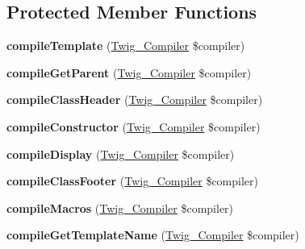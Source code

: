 \subsection*{Protected Member Functions}
\begin{DoxyCompactItemize}
\item 
\hypertarget{class_twig___node___module_a90bc59296bb0c90f305703bfd1d37566}{}{\bfseries compile\+Template} (\hyperlink{class_twig___compiler}{Twig\+\_\+\+Compiler} \$compiler)\label{class_twig___node___module_a90bc59296bb0c90f305703bfd1d37566}

\item 
\hypertarget{class_twig___node___module_ab4896098ce341e82963cb3faddd833dd}{}{\bfseries compile\+Get\+Parent} (\hyperlink{class_twig___compiler}{Twig\+\_\+\+Compiler} \$compiler)\label{class_twig___node___module_ab4896098ce341e82963cb3faddd833dd}

\item 
\hypertarget{class_twig___node___module_a0291e47aca499d273c3e735ef595c927}{}{\bfseries compile\+Class\+Header} (\hyperlink{class_twig___compiler}{Twig\+\_\+\+Compiler} \$compiler)\label{class_twig___node___module_a0291e47aca499d273c3e735ef595c927}

\item 
\hypertarget{class_twig___node___module_a2991abb5506b65360852de0145516048}{}{\bfseries compile\+Constructor} (\hyperlink{class_twig___compiler}{Twig\+\_\+\+Compiler} \$compiler)\label{class_twig___node___module_a2991abb5506b65360852de0145516048}

\item 
\hypertarget{class_twig___node___module_a448d9fcedb5f3c065b0ae27f2a111c7c}{}{\bfseries compile\+Display} (\hyperlink{class_twig___compiler}{Twig\+\_\+\+Compiler} \$compiler)\label{class_twig___node___module_a448d9fcedb5f3c065b0ae27f2a111c7c}

\item 
\hypertarget{class_twig___node___module_a8f546f1b0d652a500c848b994c2cb221}{}{\bfseries compile\+Class\+Footer} (\hyperlink{class_twig___compiler}{Twig\+\_\+\+Compiler} \$compiler)\label{class_twig___node___module_a8f546f1b0d652a500c848b994c2cb221}

\item 
\hypertarget{class_twig___node___module_aabddf2e847a3a74a0611a09b237cbfaa}{}{\bfseries compile\+Macros} (\hyperlink{class_twig___compiler}{Twig\+\_\+\+Compiler} \$compiler)\label{class_twig___node___module_aabddf2e847a3a74a0611a09b237cbfaa}

\item 
\hypertarget{class_twig___node___module_a1b94b0b10405ca45e004f560ea73d2ba}{}{\bfseries compile\+Get\+Template\+Name} (\hyperlink{class_twig___compiler}{Twig\+\_\+\+Compiler} \$compiler)\label{class_twig___node___module_a1b94b0b10405ca45e004f560ea73d2ba}


\end{DoxyCompactItemize}
